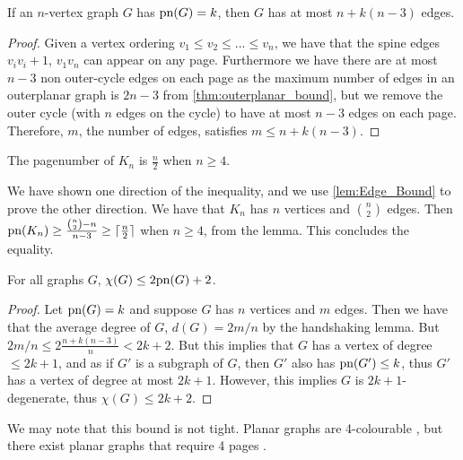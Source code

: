 \begin{lemma}\label{lem:Edge_Bound}
	If an $n$-vertex graph $G$ has $\text{pn}(G) = k$, then $G$ has at most $n + k(n-3)$ edges.
\end{lemma}
\begin{proof}
	Given a vertex ordering $v_1 \leq v_2 \leq ... \leq v_n$, we have that the spine edges $v_i v_i+1$, $v_1 v_n$  can appear on any page. Furthermore we have there are at most $n-3$ non outer-cycle edges on each page as the maximum number of edges in an outerplanar graph is $2n - 3$ from \cref{thm:outerplanar_bound}, but we remove the outer cycle (with $n$ edges on the cycle) to have at most $n-3$ edges on each page. Therefore, $m$, the number of edges, satisfies $m \leq n + k (n - 3)$. 
\end{proof}

\begin{corollary}
	The pagenumber of $K_n$ is $\frac{n}{2}$ when $n \geq 4$.
\end{corollary}
We have shown one direction of the inequality, and we use \cref{lem:Edge_Bound} to prove the other direction. We have that $K_n$ has $n$ vertices and $\binom{n}{2}$ edges. Then $\text{pn}(K_n) \geq \frac{\binom{n}{2} - n}{n - 3} \geq \lceil \frac{n}{2} \rceil$ when $n \geq 4$, from the lemma. This concludes the equality. 
\begin{theorem}\label{thm:Colouring_Bound}
	For all graphs $G$, $\chi(G) \leq 2 \text{pn}(G) + 2$.
\end{theorem}
\begin{proof}
	Let $\text{pn}(G) = k$ and suppose $G$ has $n$ vertices and $m$ edges. Then we have that the average degree of $G$, $d(G) = 2m/n$ by the handshaking lemma. But $2m/n \leq 2 \frac{n + k(n-3)}{n} < 2k + 2$. But this implies that $G$ has a vertex of degree $\leq 2k + 1$, and as if $G'$ is a subgraph of $G$, then $G'$ also has $\text{pn}(G') \leq k$, thus $G'$ has a vertex of degree at most $2k + 1$. However, this implies $G$ is $2k + 1$-degenerate, thus $\chi(G) \leq 2k + 2$. 
\end{proof}
We may note that this bound is not tight. Planar graphs are 4-colourable \cite{appelEveryPlanarMap1989}, but there exist planar graphs that require 4 pages \cite{yannakakisPlanarGraphsThat2020, kaufmannFourPagesAre2020}. 

